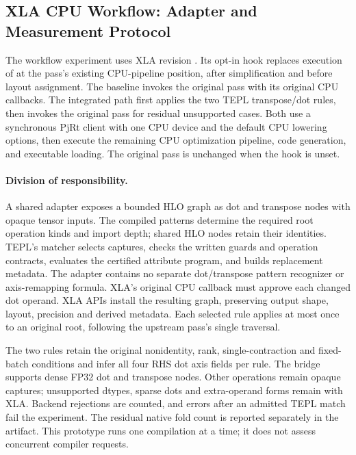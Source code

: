 \subsection{XLA CPU Workflow: Adapter and Measurement Protocol}
\label{app:xla-workflow}
The workflow experiment uses XLA revision
.
Its opt-in hook replaces execution of  at the pass's
existing CPU-pipeline position, after simplification and before layout
assignment. The baseline invokes the original pass with its original CPU
callbacks. The integrated path first applies the two TEPL transpose/dot rules,
then invokes the original pass for residual unsupported cases. Both use a synchronous PjRt client with one CPU device and the default
CPU lowering options, then execute the remaining CPU optimization pipeline, code generation, and executable
loading. The original pass is unchanged when the hook is unset.

\paragraph{Division of responsibility.}
A shared adapter exposes a bounded HLO graph as dot and transpose nodes with
opaque tensor inputs. The compiled patterns determine the required root
operation kinds and import depth; shared HLO nodes retain their identities.
TEPL's matcher selects captures, checks the written guards and operation
contracts, evaluates the certified attribute program, and builds replacement
metadata. The adapter contains no separate dot/transpose pattern recognizer
or axis-remapping formula. XLA's original CPU callback must approve each
changed dot operand. XLA APIs install the resulting graph, preserving output
shape, layout, precision and derived metadata. Each selected rule applies at
most once to an original root, following the upstream pass's single traversal.

The two rules retain the original nonidentity, rank, single-contraction and
fixed-batch conditions and infer all four RHS dot axis fields per rule.
The bridge supports dense FP32 dot and transpose nodes. Other operations
remain opaque captures; unsupported dtypes, sparse dots and extra-operand
forms remain with XLA. Backend rejections are counted, and errors after an
admitted TEPL match fail the experiment. The residual native fold count is
reported separately in the artifact. This prototype runs one compilation at
a time; it does not assess concurrent compiler requests.

